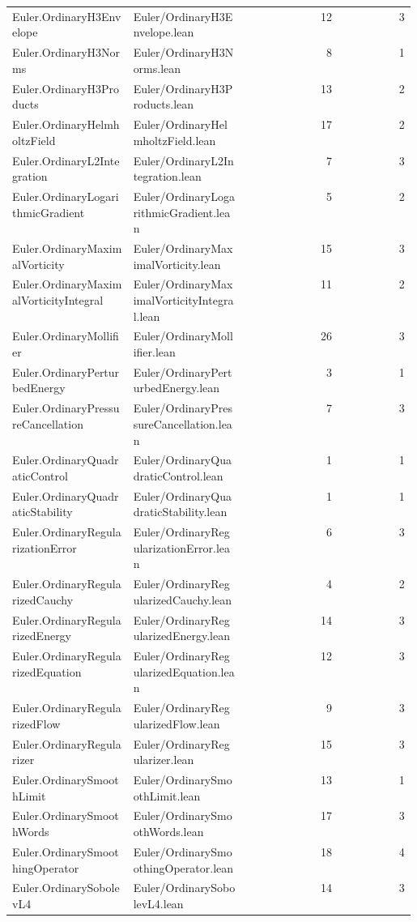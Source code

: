 \begin{longtable}{p{0.30\linewidth}p{0.28\linewidth}rr}
Euler.OrdinaryH3Envelope & Euler/OrdinaryH3Envelope.lean & 12 & 3\\
Euler.OrdinaryH3Norms & Euler/OrdinaryH3Norms.lean & 8 & 1\\
Euler.OrdinaryH3Products & Euler/OrdinaryH3Products.lean & 13 & 2\\
Euler.OrdinaryHelmholtzField & Euler/OrdinaryHelmholtzField.lean & 17 & 2\\
Euler.OrdinaryL2Integration & Euler/OrdinaryL2Integration.lean & 7 & 3\\
Euler.OrdinaryLogarithmicGradient & Euler/OrdinaryLogarithmicGradient.lean & 5 & 2\\
Euler.OrdinaryMaximalVorticity & Euler/OrdinaryMaximalVorticity.lean & 15 & 3\\
Euler.OrdinaryMaximalVorticityIntegral & Euler/OrdinaryMaximalVorticityIntegral.lean & 11 & 2\\
Euler.OrdinaryMollifier & Euler/OrdinaryMollifier.lean & 26 & 3\\
Euler.OrdinaryPerturbedEnergy & Euler/OrdinaryPerturbedEnergy.lean & 3 & 1\\
Euler.OrdinaryPressureCancellation & Euler/OrdinaryPressureCancellation.lean & 7 & 3\\
Euler.OrdinaryQuadraticControl & Euler/OrdinaryQuadraticControl.lean & 1 & 1\\
Euler.OrdinaryQuadraticStability & Euler/OrdinaryQuadraticStability.lean & 1 & 1\\
Euler.OrdinaryRegularizationError & Euler/OrdinaryRegularizationError.lean & 6 & 3\\
Euler.OrdinaryRegularizedCauchy & Euler/OrdinaryRegularizedCauchy.lean & 4 & 2\\
Euler.OrdinaryRegularizedEnergy & Euler/OrdinaryRegularizedEnergy.lean & 14 & 3\\
Euler.OrdinaryRegularizedEquation & Euler/OrdinaryRegularizedEquation.lean & 12 & 3\\
Euler.OrdinaryRegularizedFlow & Euler/OrdinaryRegularizedFlow.lean & 9 & 3\\
Euler.OrdinaryRegularizer & Euler/OrdinaryRegularizer.lean & 15 & 3\\
Euler.OrdinarySmoothLimit & Euler/OrdinarySmoothLimit.lean & 13 & 1\\
Euler.OrdinarySmoothWords & Euler/OrdinarySmoothWords.lean & 17 & 3\\
Euler.OrdinarySmoothingOperator & Euler/OrdinarySmoothingOperator.lean & 18 & 4\\
Euler.OrdinarySobolevL4 & Euler/OrdinarySobolevL4.lean & 14 & 3\\

\end{longtable}

